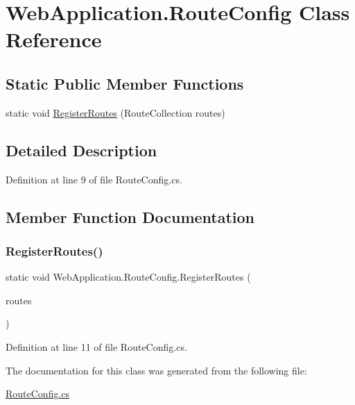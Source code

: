 \hypertarget{classWebApplication_1_1RouteConfig}{}\section{Web\+Application.\+Route\+Config Class Reference}
\label{classWebApplication_1_1RouteConfig}
\subsection*{Static Public Member Functions}
\begin{DoxyCompactItemize}
\item 
static void \mbox{\hyperlink{classWebApplication_1_1RouteConfig_a085a3963cf9c9d23bef7dd7c45601d8a}{Register\+Routes}} (Route\+Collection routes)
\end{DoxyCompactItemize}


\subsection{Detailed Description}


Definition at line 9 of file Route\+Config.\+cs.



\subsection{Member Function Documentation}
\mbox{\label{classWebApplication_1_1RouteConfig_a085a3963cf9c9d23bef7dd7c45601d8a}} 
\subsubsection{\texorpdfstring{RegisterRoutes()}{RegisterRoutes()}}
{\footnotesize\ttfamily static void Web\+Application.\+Route\+Config.\+Register\+Routes (\begin{DoxyParamCaption}\item[{Route\+Collection}]{routes }\end{DoxyParamCaption})\hspace{0.3cm}{\ttfamily [static]}}



Definition at line 11 of file Route\+Config.\+cs.



The documentation for this class was generated from the following file\+:\begin{DoxyCompactItemize}
\item 
\mbox{\hyperlink{RouteConfig_8cs}{Route\+Config.\+cs}}\end{DoxyCompactItemize}
